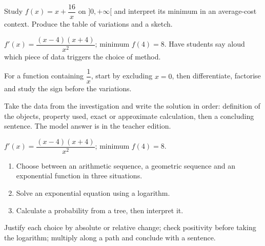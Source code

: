 \begin{activity}
Study $f(x)=x+\dfrac{16}{x}$ on $]0,+\infty[$ and interpret its minimum in an average-cost context. Produce the table of variations and a sketch.
\begin{center}\end{center}
\end{activity}
\begin{solution}$f'(x)=\dfrac{(x-4)(x+4)}{x^2}$; minimum $f(4)=8$. Have students say aloud which piece of data triggers the choice of method.\end{solution}

\begin{summary}For a function containing $\dfrac1x$, start by excluding $x=0$, then differentiate, factorise and study the sign before the variations.\end{summary}

\begin{example}
Take the data from the investigation and write the solution in order: definition of the objects, property used, exact or approximate calculation, then a concluding sentence. The model answer is in the teacher edition.
\end{example}
\begin{solution}$f'(x)=\dfrac{(x-4)(x+4)}{x^2}$; minimum $f(4)=8$.\end{solution}

\begin{exercise}[essential]
\begin{enumerate}\item Choose between an arithmetic sequence, a geometric sequence and an exponential function in three situations.\item Solve an exponential equation using a logarithm.\item Calculate a probability from a tree, then interpret it.\end{enumerate}
\end{exercise}
\begin{solution}Justify each choice by absolute or relative change; check positivity before taking the logarithm; multiply along a path and conclude with a sentence.\end{solution}


